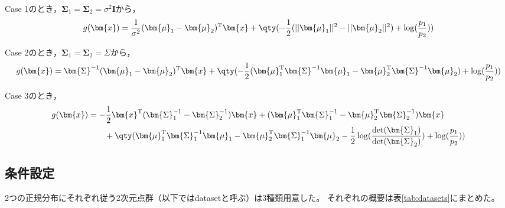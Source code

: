 \documentclass[class=jsarticle, crop=false, dvipdfmx, fleqn]{standalone}
\begin{document}
Case 1のとき，\(\bm{\Sigma}_1 = \bm{\Sigma}_2 = \sigma^2 \bm{I}\)から，
\begin{equation}
    g(\bm{x}) =
        \frac{1}{\sigma^2} (\bm{\mu}_1 - \bm{\mu}_2)^\mathrm{T} \bm{x}
        + \qty(-\frac{1}{2}(||\bm{\mu}_1||^2 - ||\bm{\mu}_2||^2) + \log(\frac{p_1}{p_2}))
\end{equation}

Case 2のとき，\(\bm{\Sigma}_1 = \bm{\Sigma}_2 = \Sigma\)から，
\begin{equation}
    g(\bm{x}) =
        \bm{\Sigma}^{-1} (\bm{\mu}_1 - \bm{\mu}_2)^\mathrm{T} \bm{x}
        + \qty(-\frac{1}{2}(\bm{\mu}_1^\mathrm{T} \bm{\Sigma}^{-1} \bm{\mu}_1 - \bm{\mu}_2^\mathrm{T} \bm{\Sigma}^{-1} \bm{\mu}_2) + \log(\frac{p_1}{p_2}))
\end{equation}

Case 3のとき，
\begin{align}
    g(\bm{x})
        & =
        - \frac{1}{2} \bm{x}^\mathrm{T} (\bm{\Sigma}_1^{-1} - \bm{\Sigma}_2^{-1}) \bm{x}
        + (\bm{\mu}_1^\mathrm{T} \bm{\Sigma}_1^{-1} - \bm{\mu}_2^\mathrm{T} \bm{\Sigma}_2^{-1}) \bm{x}
        \notag \\ & \qquad
        + \qty(
            \bm{\mu}_1^\mathrm{T} \bm{\Sigma}_1^{-1} \bm{\mu}_1 - \bm{\mu}_2^\mathrm{T} \bm{\Sigma}_1^{-1} \bm{\mu}_2
            - \frac{1}{2} \log(\frac{\det(\bm{\Sigma}_1)}{\det(\bm{\Sigma}_2)})
            + \log(\frac{p_1}{p_2})
            )
\end{align}



\subsection*{条件設定}

2つの正規分布にそれぞれ従う2次元点群（以下ではdatasetと呼ぶ）は3種類用意した。
それぞれの概要は表\ref{tab:datasets}にまとめた。
\end{document}
